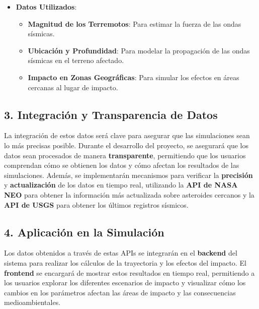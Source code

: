 \documentclass[conference]{IEEEtran}
\begin{document}
\begin{itemize}
	\item \textbf{Datos Utilizados}:
	      \begin{itemize}
		      \item \textbf{Magnitud de los Terremotos}: Para estimar la fuerza de
		            las ondas sísmicas.
		      \item \textbf{Ubicación y Profundidad}: Para modelar la propagación de
		            las ondas sísmicas en el terreno afectado.
		      \item \textbf{Impacto en Zonas Geográficas}: Para simular los efectos
		            en áreas cercanas al lugar de impacto.
	      \end{itemize}
\end{itemize}

\subsection{3. Integración y Transparencia de Datos}
La integración de estos datos será clave para asegurar que las simulaciones
sean lo más precisas posible. Durante el desarrollo del proyecto, se asegurará
que los datos sean procesados de manera \textbf{transparente}, permitiendo que
los usuarios comprendan cómo se obtienen los datos y cómo afectan los
resultados de las simulaciones. Además, se implementarán mecanismos para
verificar la \textbf{precisión} y \textbf{actualización} de los datos en
tiempo real, utilizando la \textbf{API de NASA NEO} para obtener la
información más actualizada sobre asteroides cercanos y la
\textbf{API de USGS} para obtener los últimos registros sísmicos.

\subsection{4. Aplicación en la Simulación}
Los datos obtenidos a través de estas APIs se integrarán en el \textbf{backend}
del sistema para realizar los cálculos de la trayectoria y los efectos del
impacto. El \textbf{frontend} se encargará de mostrar estos resultados en
tiempo real, permitiendo a los usuarios explorar los diferentes escenarios de
impacto y visualizar cómo los cambios en los parámetros afectan las áreas de
impacto y las consecuencias medioambientales.

\end{document}
